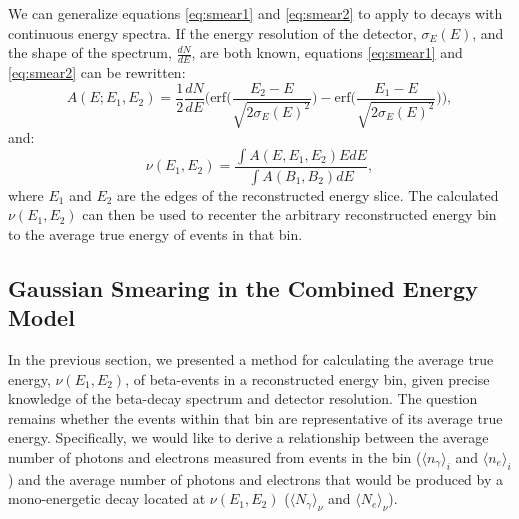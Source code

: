 We can generalize equations \ref{eq:smear1} and \ref{eq:smear2} to apply to decays with continuous energy spectra. If the energy resolution of the detector, $\sigma_E(E)$, and the shape of the spectrum, $\frac{dN}{dE}$, are both known, equations \ref{eq:smear1} and \ref{eq:smear2} can be rewritten:
\begin{equation}\label{eq:smear3}
A(E;E_1,E_2)=\frac{1}{2}\frac{dN}{dE} \Bigg(\text{erf} \bigg(\frac{E_2-E}{\sqrt{2\sigma_E(E)^2}}\bigg)-\text{erf}\bigg(\frac{E_1-E}{\sqrt{2\sigma_E(E)^2}}\bigg)\Bigg),
\end{equation}
and:
\begin{equation}\label{eq:smear4}
\nu(E_1,E_2)=\frac{\int A(E,E_1,E_2)EdE}{\int A(B_1,B_2)dE},
\end{equation}
where $E_1$ and $E_2$ are the edges of the reconstructed energy slice. The calculated $\nu(E_1,E_2)$ can then be used to recenter the arbitrary reconstructed energy bin to the average true energy of events in that bin.

\subsection{Gaussian Smearing in the Combined Energy Model}
In the previous section, we presented a method for calculating the average true energy, $\nu(E_1,E_2)$, of beta-events in a reconstructed energy bin, given precise knowledge of the beta-decay spectrum and detector resolution. The question remains whether the events within that bin are representative of its average true energy. Specifically, we would like to derive a relationship between the average number of photons and electrons measured from events in the bin ($\langle n_{\gamma}\rangle_i$ and $\langle n_{e} \rangle_i$) and the average number of photons and electrons that would be produced by a mono-energetic decay located at $\nu(E_1,E_2)$ ($\langle N_{\gamma} \rangle_{\nu}$ and $\langle N_{e} \rangle_{\nu}$). 

